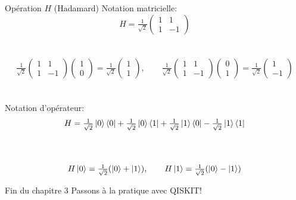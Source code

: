 \documentclass[aspectratio=169,12pt]{beamer}
\begin{document}
\begin{frame}{Opération $H$ (Hadamard)}
  Notation matricielle:
  $$
    H = \tfrac{1}{\sqrt{2}}\begin{pmatrix}1 & 1 \\ 1 & -1\end{pmatrix}
  $$\\~\\
  $$
    \tfrac{1}{\sqrt{2}}\begin{pmatrix}1 & 1 \\ 1 & -1\end{pmatrix}
    \begin{pmatrix}1\\0\end{pmatrix}=
    \tfrac{1}{\sqrt{2}}\begin{pmatrix}1\\1\end{pmatrix},
    \qquad
    \tfrac{1}{\sqrt{2}}\begin{pmatrix}1 & 1 \\ 1 & -1\end{pmatrix}
    \begin{pmatrix}0\\1\end{pmatrix}=
    \tfrac{1}{\sqrt{2}}\begin{pmatrix}1\\-1\end{pmatrix}
  $$
  ~\\~\\
  Notation d'opérateur: $$H = \tfrac{1}{\sqrt{2}} \ket 0 \bra 0 + \tfrac{1}{\sqrt{2}} \ket 0 \bra 1 + \tfrac{1}{\sqrt{2}} \ket 1 \bra 0 - \tfrac{1}{\sqrt{2}} \ket 1 \bra 1$$\\~\\
  $$
    H\ket 0 = \tfrac{1}{\sqrt{2}}(\ket 0+\ket 1), \qquad
    H\ket 1 = \tfrac{1}{\sqrt{2}}(\ket 0-\ket 1)
  $$
\end{frame}

\begin{frame}{Fin du chapitre 3}
  \centering
  \vfill
  Passons à la pratique avec QISKIT!
  \vfill
\end{frame}
\end{document}

